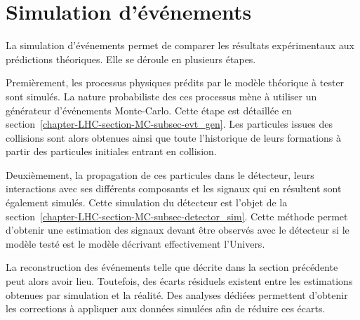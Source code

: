 \section{Simulation d'événements}\label{chapter-LHC-section-MC}
La simulation d'événements permet de comparer les résultats expérimentaux aux prédictions théoriques.
Elle se déroule en plusieurs étapes.
\par Premièrement, les processus physiques prédits par le modèle théorique à tester sont simulés.
La nature probabiliste des ces processus mène à utiliser un générateur d'événements Monte-Carlo.
Cette étape est détaillée en section~\ref{chapter-LHC-section-MC-subsec-evt_gen}.
Les particules issues des collisions sont alors obtenues ainsi que toute l'historique de leurs formations à partir des particules initiales entrant en collision.
\par Deuxièmement, la propagation de ces particules dans le détecteur, leurs interactions avec ses différents composants et les signaux qui en résultent sont également simulés.
Cette simulation du détecteur est l'objet de la section~\ref{chapter-LHC-section-MC-subsec-detector_sim}.
Cette méthode permet d'obtenir une estimation des signaux devant être observés avec le détecteur si le modèle testé est le modèle décrivant effectivement l'Univers.
\par
La reconstruction des événements telle que décrite dans la section précédente peut alors avoir lieu.
Toutefois, des écarts résiduels existent entre les estimations obtenues par simulation et la réalité.
Des analyses dédiées permettent d'obtenir les corrections à appliquer aux données simulées afin de réduire ces écarts.

